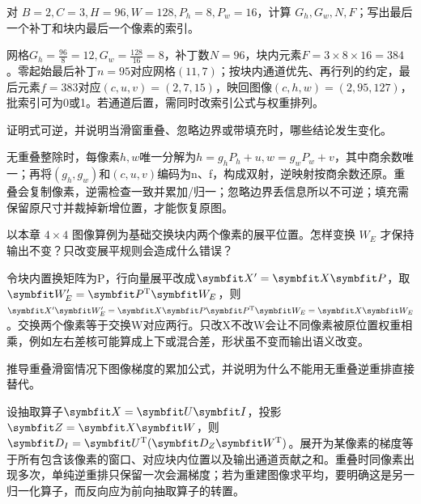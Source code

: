 
\begin{exercises}
\begin{exercise} 对 $B=2,C=3,H=96,W=128,P_h=8,P_w=16$，计算 $G_h,G_w,N,F$；写出最后一个补丁和块内最后一个像素的索引。

\begin{solution}
网格$G_h=\frac{96}{8}=12,G_w=\frac{128}{16}=8$，补丁数$N=96$，块内元素$F=3\times8\times16=384$。零起始最后补丁$n=95$对应网格$(11,7)$；按块内通道优先、再行列的约定，最后元素$f=383$对应$(c,u,v)=(2,7,15)$，映回图像$(c,h,w)=(2,95,127)$，批索引可为0或1。若通道后置，需同时改索引公式与权重排列。
\end{solution}
\end{exercise}

\begin{exercise} 证明式可逆，并说明当滑窗重叠、忽略边界或带填充时，哪些结论发生变化。

\begin{solution}
无重叠整除时，每像素$h,w$唯一分解为$h=g_hP_h+u,w=g_wP_w+v$，其中商余数唯一；再将$(g_h,g_w)$和$(c,u,v)$编码为n、f，构成双射，逆映射按商余数还原。重叠会复制像素，逆需检查一致并累加/归一；忽略边界丢信息所以不可逆；填充需保留原尺寸并裁掉新增位置，才能恢复原图。
\end{solution}
\end{exercise}

\begin{exercise} 以本章 $4\times4$ 图像算例为基础交换块内两个像素的展平位置。怎样变换 $W_E$ 才保持输出不变？只改变展平规则会造成什么错误？

\begin{solution}
令块内置换矩阵为P，行向量展平改成$\mat{X}'=\mat{X}\mat{P}$，取$\mat{W}'_E=\mat{P}^{\mathrm{T}}\mat{W}_E$，则$\mat{X}'\mat{W}'_E=\mat{X}\mat{P}\mat{P}^{\mathrm{T}}\mat{W}_E=\mat{X}\mat{W}_E$。交换两个像素等于交换W对应两行。只改X不改W会让不同像素被原位置权重相乘，例如左右差核可能算成上下或混合差，形状虽不变而输出语义改变。
\end{solution}
\end{exercise}

\begin{exercise}\optional 推导重叠滑窗情况下图像梯度的累加公式，并说明为什么不能用无重叠逆重排直接替代。

\begin{solution}
设抽取算子$\mat{X}=\mat{U}\mat{I}$，投影$\mat{Z}=\mat{X}\mat{W}$，则$\mat{D}_I=\mat{U}^{\mathrm{T}}(\mat{D}_Z\mat{W}^{\mathrm{T}})$。展开为某像素的梯度等于所有包含该像素的窗口、对应块内位置以及输出通道贡献之和。重叠时同像素出现多次，单纯逆重排只保留一次会漏梯度；若为重建图像求平均，要明确这是另一归一化算子，而反向应为前向抽取算子的转置。
\end{solution}
\end{exercise}


\end{exercises}
